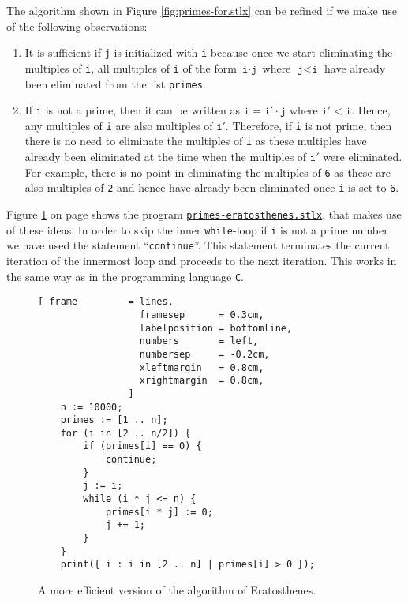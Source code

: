 The algorithm shown in Figure \ref{fig:primes-for.stlx} can be refined if we make use of the following observations:
\begin{enumerate}
\item It is sufficient if \texttt{j} is initialized with \texttt{i} because once we start eliminating the
      multiples of \texttt{i}, all multiples of \texttt{i} of the form $\texttt{i}\cdot\texttt{j}$ where
      $\texttt{j} < \texttt{i}$ have already been eliminated from the list \texttt{primes}. 
\item If \texttt{i} is not a prime, then it can be written as $\texttt{i} = \texttt{i}' \cdot\texttt{j}$ where
      $\texttt{i}' < \texttt{i}$.  Hence, any multiples of \texttt{i} are also multiples of $\texttt{i}'$.
      Therefore, if \texttt{i} is not prime, then there is no need to eliminate the multiples of
      \texttt{i} as these multiples have already been eliminated at the time when the multiples of
      $\texttt{i}'$ were eliminated.  For example, there is no point in eliminating the multiples of
      \texttt{6} as these are also multiples of \texttt{2} and hence have already been eliminated
      once \texttt{i} is set to \texttt{6}.
\end{enumerate}
Figure \ref{fig:primes-eratosthenes.stlx} on page \pageref{fig:primes-eratosthenes.stlx} shows the program
\href{https://github.com/karlstroetmann/Logik/blob/master/SetlX/primes-eratosthenes.stlx}{\texttt{primes-eratosthenes.stlx}}, 
that makes use of these ideas.  In order to skip the inner \texttt{while}-loop if \texttt{i} is not
a prime number we have used the statement ``\texttt{continue}''.  This statement terminates the
current iteration of the innermost loop and proceeds to the next iteration.  This works in the same way as in
the programming language \texttt{C}. 


\begin{figure}[!ht]
  \centering
\begin{Verbatim}[ frame         = lines, 
                  framesep      = 0.3cm, 
                  labelposition = bottomline,
                  numbers       = left,
                  numbersep     = -0.2cm,
                  xleftmargin   = 0.8cm,
                  xrightmargin  = 0.8cm,
                ]
    n := 10000;
    primes := [1 .. n];
    for (i in [2 .. n/2]) {
        if (primes[i] == 0) {
            continue;
        }
        j := i;
        while (i * j <= n) {
            primes[i * j] := 0;
            j += 1;
        }
    }
    print({ i : i in [2 .. n] | primes[i] > 0 });
\end{Verbatim} 
\vspace*{-0.3cm}
\caption{A more efficient version of the algorithm of Eratosthenes.}  \label{fig:primes-eratosthenes.stlx}
\end{figure}


